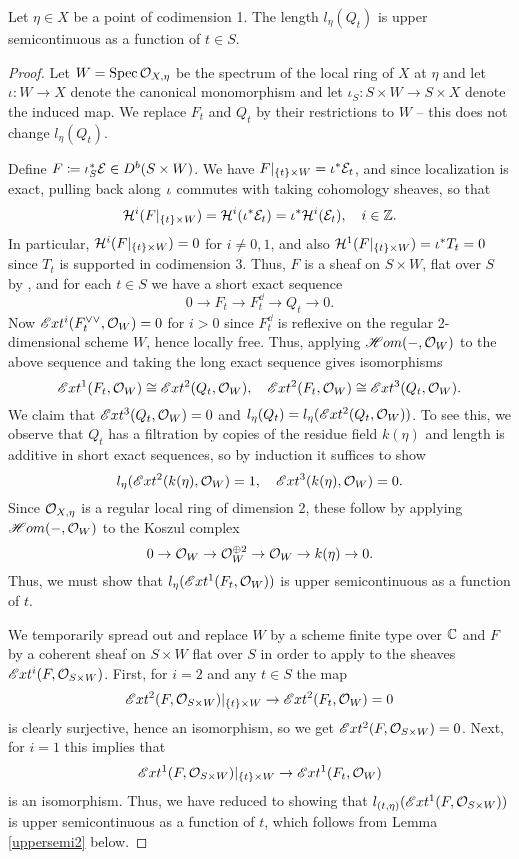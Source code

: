 \begin{lem}\label{uppersemi1}
Let $\eta \in X$ be a point of codimension 1. The length $l_\eta(Q_t)$ is upper semicontinuous as a function of $t \in S$.
\end{lem}
\begin{proof}
Let $W = \operatorname{\mathrm{Spec}} \mathcal{O}_{X,\eta}$ be the spectrum of the local ring of $X$ at $\eta$ and let $\iota: W \to X$ denote the canonical monomorphism and let $\iota_S: S \times W \to S \times X$ denote the induced map. We replace $F_t$ and $Q_t$ by their restrictions to $W$ -- this does not change $l_\eta(Q_t)$.

Define $F \coloneqq \iota_S^*\mathcal{E} \in D^b(S \times W)$. We have $F|_{\{t\} \times W} = \iota^*\mathcal{E}_t$, and since localization is exact, pulling back along $\iota$ commutes with taking cohomology sheaves, so that 
\[ \mathcal{H}^i(F|_{\{t\} \times W}) = \mathcal{H}^i(\iota^*\mathcal{E}_t) = \iota^*\mathcal{H}^i(\mathcal{E}_t), \quad i \in \mathbb{Z}. \]
In particular, $\mathcal{H}^i(F|_{\{t\} \times W}) = 0$ for $i \neq 0, 1$, and also $\mathcal{H}^1(F|_{\{t\} \times W}) = \iota^*T_t = 0$ since $T_t$ is supported in codimension 3. Thus, $F$ is a sheaf on $S \times W$, flat over $S$ by \cite[Lemma 3.31]{huy-fourier}, and for each $t \in S$ we have a short exact sequence
\[ 0 \to F_t \to F_t^\dd \to Q_t \to 0. \]
Now $\mathscr{E}xt^i(F_t^{\vee\vee}, \mathcal{O}_W) = 0$ for $i > 0$ since $F_t^\dd$ is reflexive on the regular 2-dimensional scheme $W$, hence locally free. Thus, applying $\mathscr{H}om(-, \mathcal{O}_W)$ to the above sequence and taking the long exact sequence gives isomorphisms
\[ \mathscr{E}xt^1(F_t, \mathcal{O}_W) \cong \mathscr{E}xt^2(Q_t, \mathcal{O}_W), \quad \mathscr{E}xt^2(F_t, \mathcal{O}_W) \cong \mathscr{E}xt^3(Q_t, \mathcal{O}_W). \]
We claim that $\mathscr{E}xt^3(Q_t, \mathcal{O}_W) = 0$ and $l_\eta(Q_t) = l_\eta(\mathscr{E}xt^2(Q_t, \mathcal{O}_W))$. To see this, we observe that $Q_t$ has a filtration by copies of the residue field $k(\eta)$ and length is additive in short exact sequences, so by induction it suffices to show
\[ l_\eta(\mathscr{E}xt^2(k(\eta), \mathcal{O}_W) = 1, \quad \mathscr{E}xt^3(k(\eta), \mathcal{O}_W) = 0. \]
Since $\mathcal{O}_{X,\eta}$ is a regular local ring of dimension 2, these follow by applying $\mathscr{H}om(- , \mathcal{O}_W)$ to the Koszul complex
\[ 0 \to \mathcal{O}_W \to \mathcal{O}_W^{\oplus 2} \to \mathcal{O}_W \to k(\eta) \to 0. \]
Thus, we must show that $l_\eta(\mathscr{E}xt^1(F_t, \mathcal{O}_W))$ is upper semicontinuous as a function of $t$.

We temporarily spread out and replace $W$ by a scheme finite type over $\mathbb{C}$ and $F$ by a coherent sheaf on $S \times W$ flat over $S$ in order to apply \cite[Theorem 1.9]{altklei} to the sheaves $\mathscr{E}xt^i(F, \mathcal{O}_{S\times W})$. First, for $i = 2$ and any $t \in S$ the map
\[ \mathscr{E}xt^2(F, \mathcal{O}_{S\times W})|_{\{t\} \times W} \to \mathscr{E}xt^2(F_t, \mathcal{O}_W) = 0 \]
is clearly surjective, hence an isomorphism, so we get $\mathscr{E}xt^2(F, \mathcal{O}_{S \times W}) = 0$. Next, for $i = 1$ this implies that
\[ \mathscr{E}xt^1(F, \mathcal{O}_{S \times W})|_{\{t\} \times W} \to \mathscr{E}xt^1(F_t, \mathcal{O}_W) \]
is an isomorphism. Thus, we have reduced to showing that $l_{(t,\eta)}(\mathscr{E}xt^1(F, \mathcal{O}_{S \times W}))$ is upper semicontinuous as a function of $t$, which follows from Lemma \ref{uppersemi2} below.
\end{proof}

